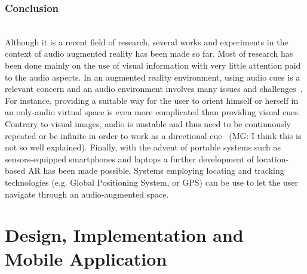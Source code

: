 \documentclass[journal]{IEEEtran}
\begin{document}
\subsubsection*{Conclusion}~\\
Although it is a recent field of research, several works and experiments in the context of audio augmented reality has been made so far. Most of research has been done mainly on the use of visual information with very little attention paid to the audio aspects. In an augmented reality environment, using audio cues is a relevant concern and an audio environment involves many issues and challenges~\cite{}. For instance, providing a suitable way for the user to orient himself or herself in an only-audio virtual space is even more complicated than providing visual cues. Contrary to visual images, audio is unstable and thus need to be continuously repeated or be infinite in order to work as a directional cue~\cite{} (MG: I think this is not so well explained).   
Finally, with the advent of portable systems such as sensors-equipped smartphones and laptops a further development of location-based AR has been made possible. Systems employing locating and tracking technologies (e.g. Global Positioning System, or GPS) can be use to let the user navigate through an audio-augmented space. 
	
\section{Design, Implementation and Mobile Application}
\end{document}
